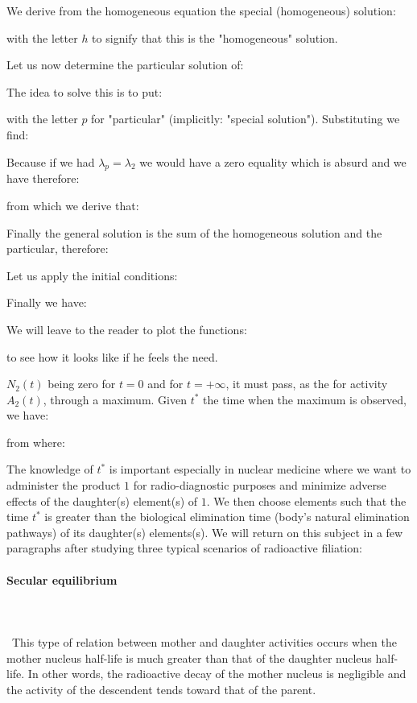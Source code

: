 	We derive from the homogeneous equation the special (homogeneous) solution:
	
	with the letter $h$ to signify that this is the "homogeneous" solution.

	Let us now determine the particular solution of:
	
	The idea to solve this is to put:
	
	with the letter $p$ for "particular" (implicitly: "special solution"). Substituting we find:
	
	Because if we had $\lambda_p=\lambda_2$ we would have a zero equality which is absurd and we have therefore:
	
	from which we derive that:
	
	Finally the general solution is the sum of the homogeneous solution and the particular, therefore:
	
	Let us apply the initial conditions:
	
	Finally we have:
	
	We will leave to the reader to plot the functions:
	
	to see how it looks like if he feels the need.
	
	$N_2(t)$ being zero for $t=0$ and for $t=+\infty$, it must pass, as the for activity $A_2(t)$, through a maximum. Given $t^{*}$ the time when the maximum is observed, we have:
	
	from where:
	
	The knowledge of $t^{*}$ is important especially in nuclear medicine where we want to administer the product $1$ for radio-diagnostic purposes  and minimize adverse effects of the daughter(s) element(s) of $1$. We then choose elements such that the time $t^{*}$ is greater than the biological elimination time (body's natural elimination pathways) of its daughter(s) elements(s). We will return on this subject in a few paragraphs after studying three typical scenarios of radioactive filiation:
	
	\paragraph{Secular equilibrium}\mbox{}\\\\\
	This type of relation between mother and daughter activities occurs when the mother nucleus half-life is much greater than that of the daughter nucleus half-life. In other words, the radioactive decay of the mother nucleus is negligible and the activity of the descendent tends toward that of the parent.

